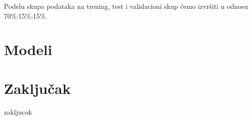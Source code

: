 \documentclass[a4paper]{article}
\begin{document}
Podelu skupa podataka na trening, test i validacioni skup ćemo izvršiti u odnosu 70\%:15\%:15\%.\\




\section{Modeli}
\label{sec:modeli}




\pagebreak

\section{Zaključak}
\label{sec:zakljucak}
zakljucak


\pagebreak

\appendix


\appendix
\end{document}
